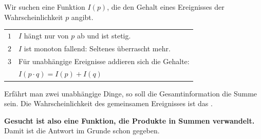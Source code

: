 \begin{merksatz}
Wir suchen eine Funktion $I(p)$, die den Gehalt eines Ereignisses der Wahrscheinlichkeit $p$ angibt.

\begin{center}
{\small
\renewcommand{\arraystretch}{1.55}
\begin{tabular}{@{}P{1.0cm}P{7.4cm}@{}}
\toprule
$1$ & $I$ hängt nur von $p$ ab und ist stetig.\\
$2$ & $I$ ist monoton fallend: Seltenes überrascht mehr.\\
$3$ & Für unabhängige Ereignisse addieren sich die Gehalte:\\
& \qquad $I(p\cdot q) = I(p) + I(q)$\\
\bottomrule
\end{tabular}}
\end{center}

Erfährt man zwei unabhängige Dinge, so soll die Gesamtinformation die Summe sein. Die Wahrscheinlichkeit des gemeinsamen Ereignisses ist das .

\begin{center}
\begin{minipage}{0.9\textwidth}
\textbf{Gesucht ist also eine Funktion, die Produkte in Summen verwandelt.} Damit ist die Antwort im Grunde schon gegeben.
\end{minipage}
\end{center}
\end{merksatz}

